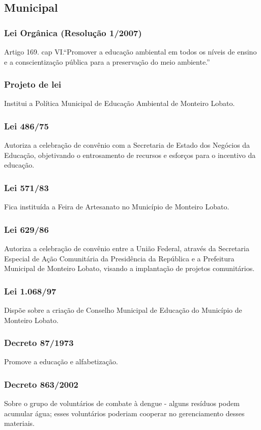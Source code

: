 \begin{subapend}
	\subsection{Municipal}
	\begin{subsubapend}
		\item \subsubsection{Lei Orgânica (Resolução 1/2007)}
		Artigo 169. cap VI.“Promover a educação ambiental em todos os níveis de ensino e a conscientização pública para a preservação do meio ambiente.”
		\subsubsection{Projeto de lei}
		Institui a Política Municipal de Educação Ambiental de Monteiro Lobato.
		\subsubsection{Lei 486/75}
		Autoriza a celebração de convênio com a Secretaria de Estado dos Negócios da Educação, objetivando o entrosamento de recursos e esforços para o incentivo da educação.
		\subsubsection{Lei 571/83}
		Fica instituída a Feira de Artesanato no Município de Monteiro Lobato.
		\subsubsection{Lei 629/86}
		Autoriza a celebração de convênio entre a União Federal, através da Secretaria Especial de Ação Comunitária da Presidência da República e a Prefeitura Municipal de Monteiro Lobato, visando a implantação de projetos comunitários.
		\subsubsection{Lei 1.068/97}
		Dispõe sobre a criação de Conselho Municipal de Educação do Município de Monteiro Lobato.
		\subsubsection{Decreto 87/1973}
		Promove a educação e alfabetização.
		\subsubsection{Decreto 863/2002}
		Sobre o grupo de voluntários de combate à dengue - alguns resíduos podem acumular água; esses voluntários poderiam cooperar no gerenciamento desses materiais.
	\end{subsubapend}
\end{subapend}

